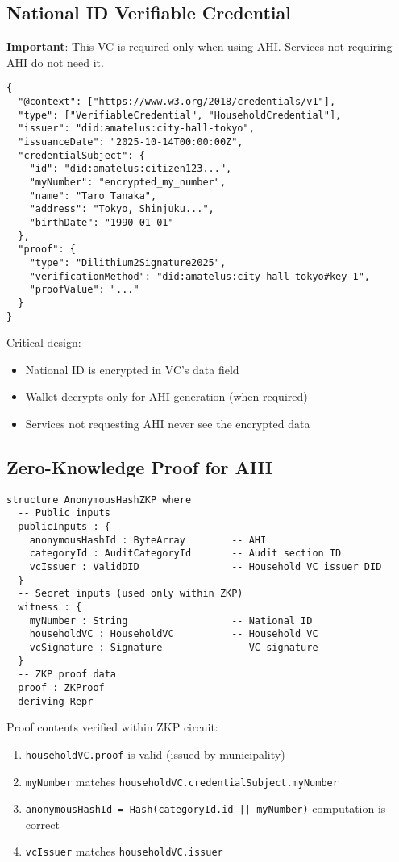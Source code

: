 \subsection{National ID Verifiable Credential}

\textbf{Important}: This VC is required only when using AHI. Services not requiring AHI do not need it.

\begin{verbatim}
{
  "@context": ["https://www.w3.org/2018/credentials/v1"],
  "type": ["VerifiableCredential", "HouseholdCredential"],
  "issuer": "did:amatelus:city-hall-tokyo",
  "issuanceDate": "2025-10-14T00:00:00Z",
  "credentialSubject": {
    "id": "did:amatelus:citizen123...",
    "myNumber": "encrypted_my_number",
    "name": "Taro Tanaka",
    "address": "Tokyo, Shinjuku...",
    "birthDate": "1990-01-01"
  },
  "proof": {
    "type": "Dilithium2Signature2025",
    "verificationMethod": "did:amatelus:city-hall-tokyo#key-1",
    "proofValue": "..."
  }
}
\end{verbatim}

Critical design:
\begin{itemize}
  \item National ID is encrypted in VC's data field
  \item Wallet decrypts only for AHI generation (when required)
  \item Services not requesting AHI never see the encrypted data
\end{itemize}

\subsection{Zero-Knowledge Proof for AHI}

\begin{verbatim}
structure AnonymousHashZKP where
  -- Public inputs
  publicInputs : {
    anonymousHashId : ByteArray        -- AHI
    categoryId : AuditCategoryId       -- Audit section ID
    vcIssuer : ValidDID                -- Household VC issuer DID
  }
  -- Secret inputs (used only within ZKP)
  witness : {
    myNumber : String                  -- National ID
    householdVC : HouseholdVC          -- Household VC
    vcSignature : Signature            -- VC signature
  }
  -- ZKP proof data
  proof : ZKProof
  deriving Repr
\end{verbatim}

Proof contents verified within ZKP circuit:
\begin{enumerate}
  \item \texttt{householdVC.proof} is valid (issued by municipality)
  \item \texttt{myNumber} matches \texttt{householdVC.credentialSubject.myNumber}
  \item \texttt{anonymousHashId = Hash(categoryId.id || myNumber)} computation is correct
  \item \texttt{vcIssuer} matches \texttt{householdVC.issuer}
\end{enumerate}

